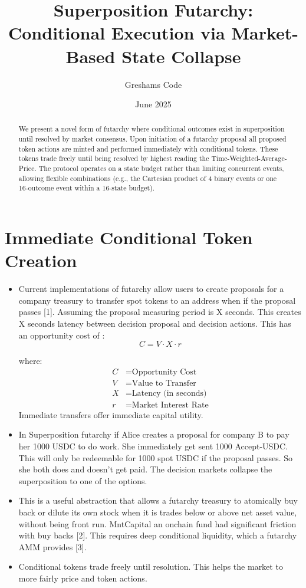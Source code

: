 \documentclass{article}
\title{Superposition Futarchy: Conditional Execution via Market-Based State Collapse}
\author[1]{Greshams Code}
\affil[1]{Founder, \href{https://govex.ai}{Govex.ai}}
\date{June 2025}
\begin{document}
\maketitle

\begin{abstract}
We present a novel form of futarchy where conditional outcomes exist in superposition until resolved by market consensus. Upon initiation of a futarchy proposal all proposed token actions are minted and performed immediately with conditional tokens. These tokens trade freely until being resolved by highest reading the Time-Weighted-Average-Price.
The protocol operates on a state budget rather than limiting concurrent events, allowing flexible combinations (e.g., the Cartesian product of 4 binary events or one 16-outcome event within a 16-state budget).
\end{abstract}


\section{Immediate Conditional Token Creation}
\begin{itemize}
    \item Current implementations of futarchy allow users to create proposals for a company treasury to transfer spot tokens to an address when if the proposal passes [1]. Assuming the proposal measuring period is X seconds. This creates X seconds latency between decision proposal and decision actions. This has an opportunity cost of : \begin{equation}
    C = V \cdot X \cdot r
    \end{equation}
    
    where:
    \begin{align*}
    C &= \text{Opportunity Cost} \\
    V &= \text{Value to Transfer} \\
    X &= \text{Latency (in seconds)} \\
    r &= \text{Market Interest Rate}
    \end{align*}
    Immediate transfers offer immediate capital utility.
    \item In Superposition futarchy if Alice creates a proposal for company B to pay her 1000 USDC to do work. She immediately get sent 1000 Accept-USDC. This will only be redeemable for 1000 spot USDC if the proposal passes. So she both does and doesn't get paid. The decision markets collapse the superposition to one of the options.
    \item This is a useful abstraction that allows a futarchy treasury to atomically buy back or dilute its own stock when it is trades below or above net asset value, without being front run. MntCapital an onchain fund had significant friction with buy backs [2]. This requires deep conditional liquidity, which a futarchy AMM provides [3].
   \item Conditional tokens trade freely until resolution. This helps the market to more fairly price and token actions. 

\end{itemize}
\end{document}
